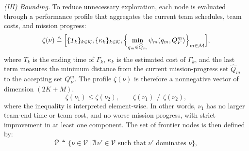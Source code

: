 \emph{(III) Bounding.}
To reduce unnecessary exploration, each node is evaluated through a performance
profile that aggregates the current team schedules, team costs, and mission
progress:
\begin{equation}
\label{ch04:eq:profile}
\zeta(\nu) \triangleq
\Bigl[
\{T_k\}_{k\in\mathcal{K}},
\{\kappa_k\}_{k\in\mathcal{K}},
\Bigl\{
\min_{q_m\in\widehat{Q}_m}\psi_m(q_m,Q_F^m)
\Bigr\}_{m\in\mathcal{M}}
\Bigr],
\end{equation}
where $T_k$ is the ending time of $\Gamma_k$, $\kappa_k$ is the estimated cost
of $\Gamma_k$, and the last term measures the minimum distance from the current
mission-progress set $\widehat{Q}_m$ to the accepting set $Q_F^m$. The profile
$\zeta(\nu)$ is therefore a nonnegative vector of dimension $(2K+M)$.
\begin{equation}
\label{ch04:eq:dominance}
\zeta(\nu_1)\leq \zeta(\nu_2), \qquad
\zeta(\nu_1)\neq \zeta(\nu_2),
\end{equation}
where the inequality is interpreted element-wise. In other words, $\nu_1$ has
no larger team-end time or team cost, and no worse mission progress, with
strict improvement in at least one component. The set of frontier nodes is then
defined by:
\begin{equation}
\label{ch04:eq:frontier}
\overline{\mathcal{V}} \triangleq
\bigl\{
\nu\in\mathcal{V} \,\big|\,
\nexists\,\nu'\in\mathcal{V} \text{ such that } \nu' \text{ dominates } \nu
\bigr\},
\end{equation}

